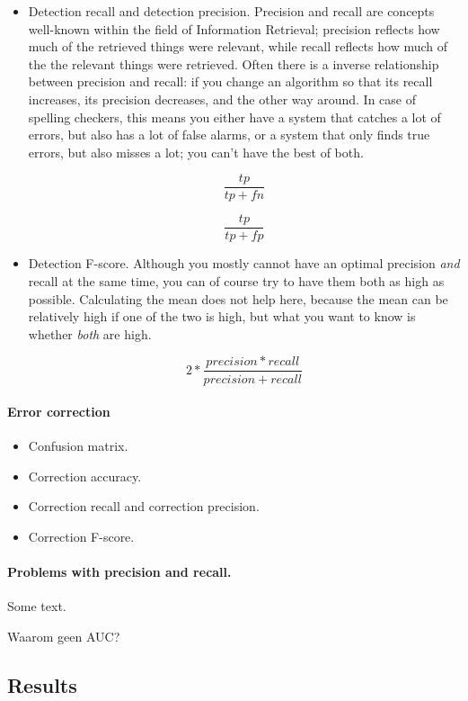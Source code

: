 \documentclass[12pt]{article}
\begin{document}
\begin{itemize}
\item Detection recall and detection precision. 
Precision and recall are concepts well-known within the field of Information Retrieval; precision reflects how much of the retrieved things were relevant, while recall reflects how much of the the relevant things were retrieved. Often there is a inverse relationship between precision and recall: if you change an algorithm so that its recall increases, its precision decreases, and the other way around. In case of spelling checkers, this means you either have a system that catches a lot of errors, but also has a lot of false alarms, or a system that only finds true errors, but also misses a lot; you can't have the best of both.

\[
\frac{tp}{tp+fn}
\]

\[
\frac{tp}{tp+fp}
\]

\item Detection F-score. 
Although you mostly cannot have an optimal precision \emph{and} recall at the same time, you can of course try to have them both as high as possible. Calculating the mean does not help here, because the mean can be relatively high if one of the two is high, but what you want to know is whether \emph{both} are high.

\[
2 * \frac{precision * recall}{precision + recall}
\]

\end{itemize}

\paragraph{Error correction}

\begin{itemize}
\item Confusion matrix.
\item Correction accuracy.
\item Correction recall and correction precision.
\item Correction F-score.
\end{itemize}

\paragraph{Problems with precision and recall.} Some text.

Waarom geen AUC?

\subsection{Results}
\end{document}
